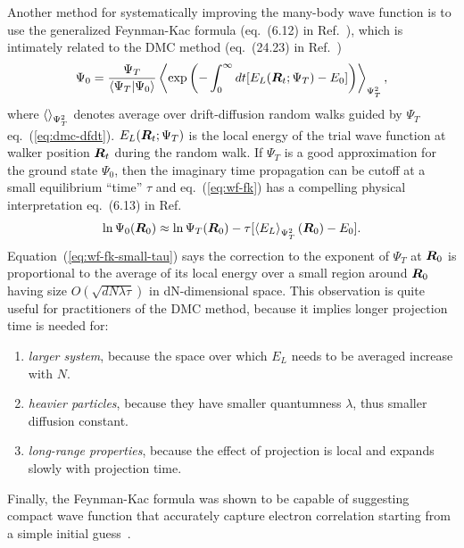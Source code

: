 Another method for systematically improving the many-body wave function is to use the generalized Feynman-Kac formula (eq.~(6.12) in Ref.~\cite{Martin2016}), which is intimately related to the DMC method (eq.~(24.23) in Ref.~\cite{Martin2016})
\begin{align} \label{eq:wf-fk}
\Psi_0 = \dfrac{\Psi_T}{\braket{\Psi_T|\Psi_0}}\left\langle
\exp\left(
-\int_0^\infty dt [E_L(\boldsymbol{R}_t;\Psi_T)-E_0]
\right)
\right\rangle_{\Psi_T^2},
\end{align}
where $\braket{}_{\Psi_T^2}$ denotes average over drift-diffusion random walks guided by $\Psi_T$ eq.~(\ref{eq:dmc-dfdt}). $E_L(\boldsymbol{R}_t;\Psi_T)$ is the local energy of the trial wave function at walker position $\boldsymbol{R}_t$ during the random walk. If $\Psi_T$ is a good approximation for the ground state $\Psi_0$, then the imaginary time propagation can be cutoff at a small equilibrium ``time'' $\tau$ and eq.~(\ref{eq:wf-fk}) has a compelling physical interpretation eq.~(6.13) in Ref.~\cite{Martin2016}
\begin{align} \label{eq:wf-fk-small-tau}
\ln\Psi_0(\boldsymbol{R}_0) \approx \ln\Psi_T(\boldsymbol{R}_0) - \tau [
\left\langle E_L\right\rangle_{\Psi_T^2}(\boldsymbol{R}_0) - E_0
].
\end{align}
Equation~(\ref{eq:wf-fk-small-tau}) says the correction to the exponent of $\Psi_T$ at $\boldsymbol{R}_0$ is proportional to the average of its local energy over a small region around $\boldsymbol{R}_0$ having size $O(\sqrt{d N\lambda\tau})$ in dN-dimensional space. This observation is quite useful for practitioners of the DMC method, because it implies longer projection time is needed for:
\begin{enumerate}
\item \textit{larger system}, because the space over which $E_L$ needs to be averaged increase with $N$.
\item \textit{heavier particles}, because they have smaller quantumness $\lambda$, thus smaller diffusion constant.
\item \textit{long-range properties}, because the effect of projection is local and expands slowly with projection time.
\end{enumerate}

Finally, the Feynman-Kac formula was shown to be capable of suggesting compact wave function that accurately capture electron correlation starting from a simple initial guess~\cite{Holzmann2003}.
